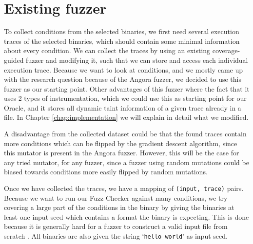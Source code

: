 \section{Existing fuzzer}
To collect conditions from the selected binaries, we first need several execution traces of the selected binaries, which should contain some minimal information about every condition. We can collect the traces by using an existing coverage-guided fuzzer and modifying it, such that we can store and access each individual execution trace.
Because we want to look at conditions, and we mostly came up with the research question because of the Angora fuzzer, we decided to use this fuzzer as our starting point. Other advantages of this fuzzer where the fact that it uses 2 types of instrumentation, which we could use this as starting point for our Oracle, and it stores all dynamic taint information of a given trace already in a file. 
In Chapter \ref{chap:implementation} we will explain in detail what we modified.

A disadvantage from the collected dataset could be that the found traces contain more conditions which can be flipped by the gradient descent algorithm, since this mutator is present in the Angora fuzzer. However, this will be the case for any tried mutator, for any fuzzer, since a fuzzer using random mutations could be biased towards conditions more easily flipped by random mutations.



Once we have collected the traces, we have a mapping of \texttt{(input, trace)} pairs. Because we want to run our Fuzz Checker against many conditions, we try covering a large part of the conditions in the binary by giving the binaries at least one input seed which contains a format the binary is expecting. This is done because it is generally hard for a fuzzer to construct a valid input file from scratch \cite{you2019slf}.
All binaries are also given the string `\texttt{hello world}' as input seed.

